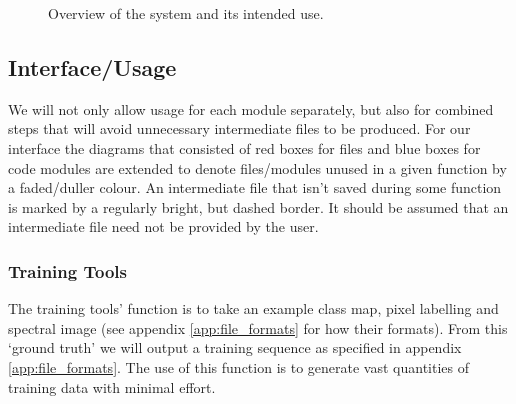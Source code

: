 \documentclass[12pt,twoside,notitlepage]{report}
\begin{document}
\begin{figure}[H]
{\begin{tikzpicture}[node distance=2cm,>=stealth',bend angle=45,auto]
                                
                        \end{tikzpicture}
                    }

                \caption{Overview of the system and its intended use.}
                \label{fig:system_overview}
            \end{figure}   



        \subsection{Interface/Usage}
            We will not only allow usage for each module separately, but also for combined steps that will 
            avoid unnecessary intermediate files to be produced. For our interface the diagrams that consisted 
            of red boxes for files and blue boxes for code modules are extended to denote files/modules unused in a given function 
            by a faded/duller colour. An intermediate file that isn't saved during some function is marked by a 
            regularly bright, but dashed border. It should be assumed that an intermediate file need not be provided 
            by the user.




            \subsubsection{Training Tools}
                The training tools' function is to take an example class map, pixel labelling and spectral image (see 
                appendix \ref{app:file_formats} for how their formats). From this `ground truth' we will output a 
                training sequence as specified in appendix \ref{app:file_formats}. The use of this function is to 
                generate vast quantities of training data with minimal effort.
\end{document}
